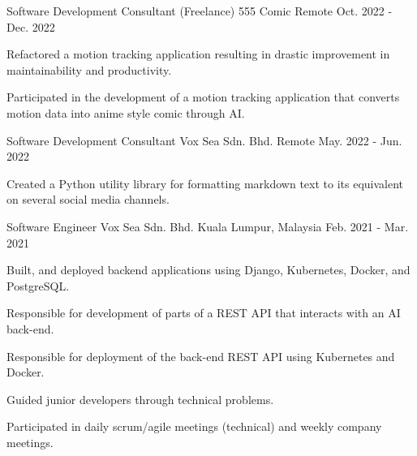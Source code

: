 

\begin{cventries}

\cventry
  {Software Development Consultant (Freelance)} %
  {555 Comic} %
  {Remote} %
  {Oct. 2022 - Dec. 2022} %
  {
    \begin{cvitems} %
      \item {Refactored a motion tracking application resulting in drastic improvement in maintainability and productivity.}
      \item {Participated in the development of a motion tracking application that converts motion data into anime style comic through AI.}
    \end{cvitems}
  }

  \cventry
    {Software Development Consultant} %
    {Vox Sea Sdn. Bhd.} %
    {Remote} %
    {May. 2022 - Jun. 2022} %
    {
      \begin{cvitems} %
        \item {Created a Python utility library for formatting markdown text to its equivalent on several social media channels.}
      \end{cvitems}
    }

  \cventry
    {Software Engineer} %
    {Vox Sea Sdn. Bhd.} %
    {Kuala Lumpur, Malaysia} %
    {Feb. 2021 - Mar. 2021} %
    {
      \begin{cvitems} %
        \item {Built, and deployed backend applications using Django, Kubernetes, Docker, and PostgreSQL.}
        \item {Responsible for development of parts of a REST API that interacts with an AI back-end.}
        \item {Responsible for deployment of the back-end REST API using Kubernetes and Docker.}
        \item {Guided junior developers through technical problems.}
        \item {Participated in daily scrum/agile meetings (technical) and weekly company meetings.}
      \end{cvitems}
    }


\end{cventries}
